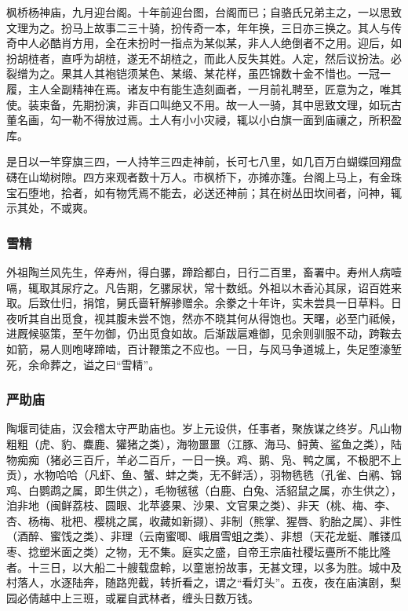 \documentclass[]{article}
\begin{document}
枫桥杨神庙，九月迎台阁。十年前迎台图，台阁而已；自骆氏兄弟主之，一以思致文理为之。扮马上故事二三十骑，扮传奇一本，年年换，三日亦三换之。其人与传奇中人必酷肖方用，全在未扮时一指点为某似某，非人人绝倒者不之用。迎后，如扮胡梿者，直呼为胡梿，遂无不胡梿之，而此人反失其姓。人定，然后议扮法。必裂缯为之。果其人其袍铠须某色、某缎、某花样，虽匹锦数十金不惜也。一冠一履，主人全副精神在焉。诸友中有能生造刻画者，一月前礼聘至，匠意为之，唯其使。装束备，先期扮演，非百口叫绝又不用。故一人一骑，其中思致文理，如玩古董名画，勾一勒不得放过焉。土人有小小灾祲，辄以小白旗一面到庙禳之，所积盈库。

是日以一竿穿旗三四，一人持竿三四走神前，长可七八里，如几百万白蝴蝶回翔盘礴在山坳树隙。四方来观者数十万人。市枫桥下，亦摊亦篷。台阁上马上，有金珠宝石堕地，拾者，如有物凭焉不能去，必送还神前；其在树丛田坎间者，问神，辄示其处，不或爽。

\hypertarget{header-n302}{%
\subsubsection{雪精}\label{header-n302}}

外祖陶兰风先生，倅寿州，得白骡，蹄跲都白，日行二百里，畜署中。寿州人病噎嗝，辄取其尿疗之。凡告期，乞骡尿状，常十数纸。外祖以木香沁其尿，诏百姓来取。后致仕归，捐馆，舅氏啬轩解骖赠余。余豢之十年许，实未尝具一日草料。日夜听其自出觅食，视其腹未尝不饱，然亦不晓其何从得饱也。天曙，必至门祗候，进厩候驱策，至午勿御，仍出觅食如故。后渐跋扈难御，见余则驯服不动，跨鞍去如箭，易人则咆哮蹄啮，百计鞭策之不应也。一日，与风马争道城上，失足堕濠堑死，余命葬之，谥之曰``雪精''。

\hypertarget{header-n307}{%
\subsubsection{严助庙}\label{header-n307}}

陶堰司徒庙，汉会稽太守严助庙也。岁上元设供，任事者，聚族谋之终岁。凡山物粗粗（虎、豹、麋鹿、獾猪之类），海物噩噩（江豚、海马、鲟黄、鲨鱼之类），陆物痴痴（猪必三百斤，羊必二百斤，一日一换。鸡、鹅、凫、鸭之属，不极肥不上贡），水物哈哈（凡虾、鱼、蟹、蚌之类，无不鲜活），羽物毨毨（孔雀、白鹇、锦鸡、白鹦鹉之属，即生供之），毛物毧毧（白鹿、白兔、活貂鼠之属，亦生供之），洎非地（闽鲜荔枝、圆眼、北苹婆果、沙果、文官果之类）、非天（桃、梅、李、杏、杨梅、枇杷、樱桃之属，收藏如新撷）、非制（熊掌、猩唇、豹胎之属）、非性（酒醉、蜜饯之类）、非理（云南蜜唧、峨眉雪蛆之类）、非想（天花龙蜓、雕镂瓜枣、捻塑米面之类）之物，无不集。庭实之盛，自帝王宗庙社稷坛亹所不能比隆者。十三日，以大船二十艘载盘軨，以童崽扮故事，无甚文理，以多为胜。城中及村落人，水逐陆奔，随路兜截，转折看之，谓之``看灯头''。五夜，夜在庙演剧，梨园必倩越中上三班，或雇自武林者，缠头日数万钱。
\end{document}
